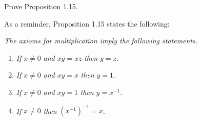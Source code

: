 \newpage
Prove Proposition 1.15.


\vspace{2mm}
\solve
As a reminder, Proposition 1.15 states the following:

\vspace{2mm}
\noindent\textit{The axioms for multiplication imply the following statements.}
\begin{enumerate}[label={(\alph*)}]
    \item \textit{If} $x \neq 0$ \textit{and}  $xy = xz$ \textit{then} $y = z$.
    \item \textit{If} $x \neq 0$ \textit{and}  $xy = x$ \textit{then} $y = 1$.
    \item \textit{If} $x \neq 0$ \textit{and}  $xy = 1$ \textit{then} $y = x^{-1}$.
    \item \textit{If} $x \neq 0$ \textit{then} $(x^{-1})^{-1} = x$.
\end{enumerate}

